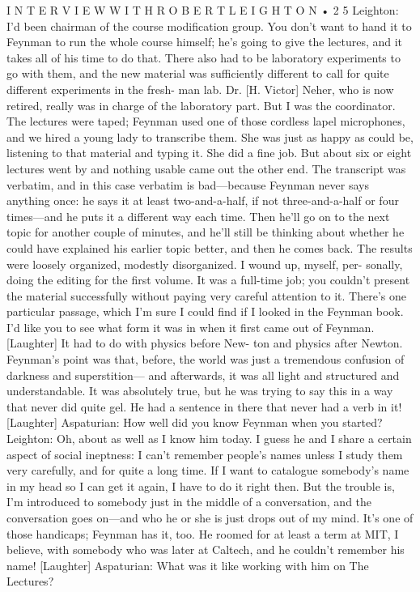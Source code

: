 \documentclass[10pt,oneside]{article}
\begin{document}
I N T E R V I E W  W I T H  R O B E R T  L E I G H T O N • 2 5 Leighton: I’d been chairman of the course modification group. You don’t want to hand it to Feynman to run the whole course himself; he’s going to give the lectures, and it takes all of his time to do that. There also had to be laboratory experiments to go with them, and the new material was sufficiently different to call for quite different experiments in the fresh- man lab. Dr. [H. Victor] Neher, who is now retired, really was in charge of the laboratory part. But I was the coordinator. The lectures were taped; Feynman used one of those cordless lapel microphones, and we hired a young lady to transcribe them. She was just as happy as could be, listening to that material and typing it. She did a fine job. But about six or eight lectures went by and nothing usable came out the other end. The transcript was verbatim, and in this case verbatim is bad---because Feynman never says anything once: he says it at least two-and-a-half, if not three-and-a-half or four times---and he puts it a different way each time. Then he’ll go on to the next topic for another couple of minutes, and he’ll still be thinking about whether he could have explained his earlier topic better, and then he comes back. The results were loosely organized, modestly disorganized. I wound up, myself, per- sonally, doing the editing for the first volume. It was a full-time job; you couldn’t present the material successfully without paying very careful attention to it. There’s one particular passage, which I’m sure I could find if I looked in the Feynman book. I’d like you to see what form it was in when it first came out of Feynman. [Laughter] It had to do with physics before New- ton and physics after Newton. Feynman’s point was that, before, the world was just a tremendous confusion of darkness and superstition--- and afterwards, it was all light and structured and understandable. It was absolutely true, but he was trying to say this in a way that never did quite gel. He had a sentence in there that never had a verb in it! [Laughter] Aspaturian: How well did you know Feynman when you started? Leighton: Oh, about as well as I know him today. I guess he and I share a certain aspect of social ineptness: I can’t remember people’s names unless I study them very carefully, and for quite a long time. If I want to catalogue somebody’s name in my head so I can get it again, I have to do it right then. But the trouble is, I’m introduced to somebody just in the middle of a conversation, and the conversation goes on---and who he or she is just drops out of my mind. It’s one of those handicaps; Feynman has it, too. He roomed for at least a term at MIT, I believe, with somebody who was later at Caltech, and he couldn’t remember his name! [Laughter] Aspaturian: What was it like working with him on The Lectures?\par
\end{document}
